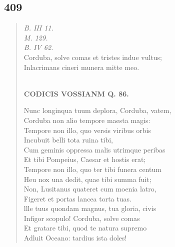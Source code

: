 \documentclass[11pt, a4paper]{report}
\begin{document}
            \subsection*{409}
      \begin{verse}
      \textit{B. III 11.} \\ \textit{M. 129.} \\ \textit{B. IV 62.} \\ Corduba, solve comas et tristes indue vultus; \\ Inlacrimans cineri munera mitte meo. \\ 
        ﻿\pagebreak 
     \marginpar{[317]} \begin{center} \textbf{CODICIS VOSSIANM Q. 86.} \end{center}Nunc longinqua tuum deplora, Corduba, vatem, \\ Corduba non alio tempore maesta magis: \\ Tempore non illo, quo versis viribus orbis \\ Incubuit belli tota ruina tibi, \\ Cum geminis oppressa malis utrimque peribas \\ Et tibi Pompeius, Caesar et hostis erat; \\ Tempore non illo, quo ter tibi funera centum \\ Heu nox una dedit, quae tibi summa fuit; \\ Non, Lusitanus quateret cum moenia latro, \\ Figeret et portas lancea torta tuas. \\ llle tuus quondam magnus, tua gloria, civis \\ Infigor scopulo! Corduba, solve comas \\ Et gratare tibi, quod te natura supremo \\ Adluit Oceano: tardius ista doles! \\ 
      \end{verse}
  
\end{document}
